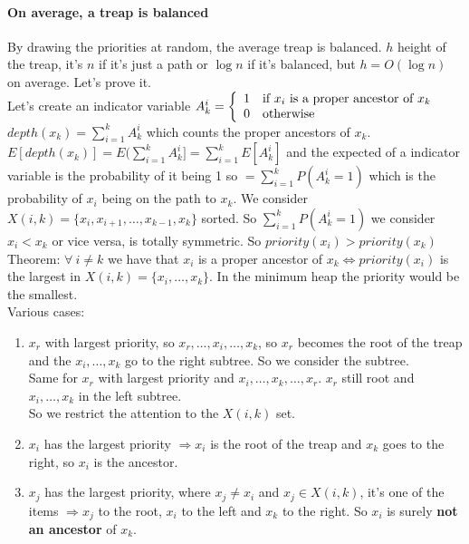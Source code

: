 \documentclass[10pt]{report}
\begin{document}
\paragraph{On average, a treap is balanced} By drawing the priorities at random, the average treap is balanced. $h$ height of the treap, it's $n$ if it's just a path or $\log n$ if it's balanced, but $h = O(\log n)$ on average. Let's prove it.\\
Let's create an indicator variable $A_k^i = \left\{ \begin{array}{c l}
1&\hbox{if }x_i\hbox{ is a proper ancestor of }x_k\\
0&\hbox{otherwise}
\end{array}\right.$\\
$depth(x_k) = \sum_{i=1}^k A_k^i$ which counts the proper ancestors of $x_k$. $E[depth(x_k)] = E(\sum_{i=1}^k A_k^i] = \sum_{i=1}^k E[A_k^i]$ and the expected of a indicator variable is the probability of it being 1 so $= \sum_{i=1}^k P(A_k^i = 1)$ which is the probability of $x_i$ being on the path to $x_k$. We consider $X(i,k)=\{x_i,x_{i+1},\ldots,x_{k-1}, x_k\}$ sorted. So $\sum_{i=1}^k P(A_k^i = 1)$ we consider $x_i < x_k$ or vice versa, is totally symmetric. So $priority(x_i) > priority(x_k)$\\
Theorem: $\forall\: i \neq k$ we have that $x_i$ is a proper ancestor of $x_k \Leftrightarrow priority(x_i)$ is the largest in $X(i,k) = \{x_i,\ldots,x_k\}$. In the minimum heap the priority would be the smallest.\\
Various cases:
\begin{enumerate}
	\item $x_r$ with largest priority, so $x_r,\ldots, x_i,\ldots, x_k$, so $x_r$ becomes the root of the treap and the $x_i,\ldots, x_k$ go to the right subtree. So we consider the subtree.\\
	Same for $x_r$ with largest priority and $x_i,\ldots, x_k,\ldots, x_r$. $x_r$ still root and $x_i,\ldots,x_k$ in the left subtree.\\
	So we restrict the attention to the $X(i,k)$ set.
	\item $x_i$ has the largest priority $\Rightarrow x_i$ is the root of the treap and $x_k$ goes to the right, so $x_i$ is the ancestor.
	\item $x_j$ has the largest priority, where $x_j\neq x_i$ and $x_j \in X(i,k)$, it's one of the items $\Rightarrow x_j$ to the root, $x_i$ to the left and $x_k$ to the right. So $x_i$ is surely \textbf{not an ancestor} of $x_k$.
\end{enumerate}
\end{document}
